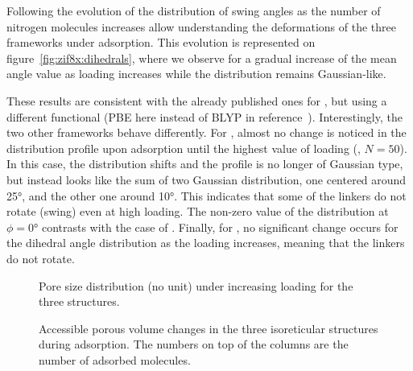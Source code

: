 \documentclass[thesis]{subfiles}
\begin{document}
Following the evolution of the distribution of swing angles as the number of
nitrogen molecules increases allow understanding the deformations of the three
frameworks under adsorption. This evolution is represented on
figure~\ref{fig:zif8x:dihedrals}, where we observe for  a gradual
increase of the mean angle value as loading increases while the distribution
remains Gaussian-like.

These results are consistent with the already published ones for
\cite{Coudert2017}, but using a different functional (PBE here instead of
BLYP in reference~\cite{Coudert2017}). Interestingly, the two other frameworks behave
differently. For \ZIFCl, almost no change is noticed in the distribution profile
upon adsorption until the highest value of loading (\ie, $N = 50$). In this
case, the distribution shifts and the profile is no longer of Gaussian type, but
instead looks like the sum of two Gaussian distribution, one centered around
25°, and the other one around 10°. This indicates that some of the linkers do not
rotate (swing) even at high loading. The non-zero value of the distribution at
$\phi = 0\text{°}$ contrasts with the case of . Finally, for \ZIFBr, no
significant change occurs for the dihedral angle distribution as the loading
increases, meaning that the linkers do not rotate.

\begin{figure}[t]
    \centering
    
    \caption{Pore size distribution (no unit) under increasing loading for the
    three structures.}
    \label{fig:zif8x:pores-sizes}
\end{figure}

\begin{figure}[b]
    \centering
    
    \caption{Accessible porous volume changes in the three isoreticular
    structures during adsorption. The numbers on top of the columns are the
    number of adsorbed  molecules.}
    \label{fig:zif8x:porous-volume}
\end{figure}
\end{document}
